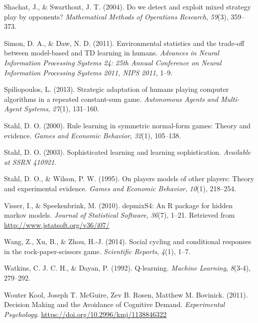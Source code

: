 \documentclass[man,floatsintext]{apa6}
\begin{document}
\leavevmode\hypertarget{ref-shachat2004we}{}%
Shachat, J., \& Swarthout, J. T. (2004). Do we detect and exploit mixed strategy play by opponents? \emph{Mathematical Methods of Operations Research}, \emph{59}(3), 359--373.

\leavevmode\hypertarget{ref-Simon_Daw_11}{}%
Simon, D. A., \& Daw, N. D. (2011). Environmental statistics and the trade-off between model-based and TD learning in humans. \emph{Advances in Neural Information Processing Systems 24: 25th Annual Conference on Neural Information Processing Systems 2011, NIPS 2011}, 1--9.

\leavevmode\hypertarget{ref-spiliopoulos2013strategic}{}%
Spiliopoulos, L. (2013). Strategic adaptation of humans playing computer algorithms in a repeated constant-sum game. \emph{Autonomous Agents and Multi-Agent Systems}, \emph{27}(1), 131--160.

\leavevmode\hypertarget{ref-stahl2000rule}{}%
Stahl, D. O. (2000). Rule learning in symmetric normal-form games: Theory and evidence. \emph{Games and Economic Behavior}, \emph{32}(1), 105--138.

\leavevmode\hypertarget{ref-stahl2003sophisticated}{}%
Stahl, D. O. (2003). Sophisticated learning and learning sophistication. \emph{Available at SSRN 410921}.

\leavevmode\hypertarget{ref-stahl1995players}{}%
Stahl, D. O., \& Wilson, P. W. (1995). On players models of other players: Theory and experimental evidence. \emph{Games and Economic Behavior}, \emph{10}(1), 218--254.

\leavevmode\hypertarget{ref-R-depmixS4}{}%
Visser, I., \& Speekenbrink, M. (2010). depmixS4: An R package for hidden markov models. \emph{Journal of Statistical Software}, \emph{36}(7), 1--21. Retrieved from \url{http://www.jstatsoft.org/v36/i07/}

\leavevmode\hypertarget{ref-wang2014social}{}%
Wang, Z., Xu, B., \& Zhou, H.-J. (2014). Social cycling and conditional responses in the rock-paper-scissors game. \emph{Scientific Reports}, \emph{4}(1), 1--7.

\leavevmode\hypertarget{ref-watkins1992q}{}%
Watkins, C. J. C. H., \& Dayan, P. (1992). Q-learning. \emph{Machine Learning}, \emph{8}(3-4), 279--292.

\leavevmode\hypertarget{ref-Kool_2011}{}%
Wouter Kool, Joseph T. McGuire, Zev B. Rosen, Matthew M. Bovinick. (2011). Decision Making and the Avoidance of Cognitive Demand. \emph{Experimental Psychology}. \url{https://doi.org/10.2996/kmj/1138846322}

\endgroup
\end{document}
